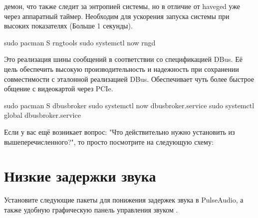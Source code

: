 \documentclass[letterpaper,10pt,russian,openany]{sphinxmanual}
\begin{document}
\sphinxAtStartPar
{}  \sphinxhyphen{} демон, что также следит за энтропией системы, но в отличие от haveged уже через аппаратный таймер.
Необходим для ускорения запуска системы при высоких показателях  (Больше 1 секунды).

\begin{sphinxVerbatim}[commandchars=\\\{\}]
sudo pacman \PYGZhy{}S rng\PYGZhy{}tools         
sudo systemctl  \PYGZhy{}\PYGZhy{}now rngd 
\end{sphinxVerbatim}

\sphinxAtStartPar
{}  \sphinxhyphen{} Это реализация шины сообщений в соответствии со спецификацией D\sphinxhyphen{}Bus.
Её цель \sphinxhyphen{} обеспечить высокую производительность и надежность при сохранении совместимости с эталонной реализацией D\sphinxhyphen{}Bus.
Обеспечивает чуть более быстрое общение с видеокартой через PCIe.

\begin{sphinxVerbatim}[commandchars=\\\{\}]
sudo pacman \PYGZhy{}S dbus\PYGZhy{}broker                         
sudo systemctl  \PYGZhy{}\PYGZhy{}now dbus\PYGZhy{}broker.service    
sudo systemctl \PYGZhy{}\PYGZhy{}global  dbus\PYGZhy{}broker.service 
\end{sphinxVerbatim}

\sphinxAtStartPar
Если у вас ещё возникает вопрос: "Что действительно нужно установить из вышеперечисленного?",
то просто посмотрите на следующую схему:

\noindent{}

\ignorespaces 

\section{Низкие задержки звука}
\label{\detokenize{source/generic-system-acceleration:lowlatency-audio}}\label{\detokenize{source/generic-system-acceleration:index-5}}\label{\detokenize{source/generic-system-acceleration:id4}}
\sphinxAtStartPar
Установите следующие пакеты для понижения задержек звука в PulseAudio,
а также удобную графическую панель управления звуком \sphinxhyphen{}  .
\end{document}
